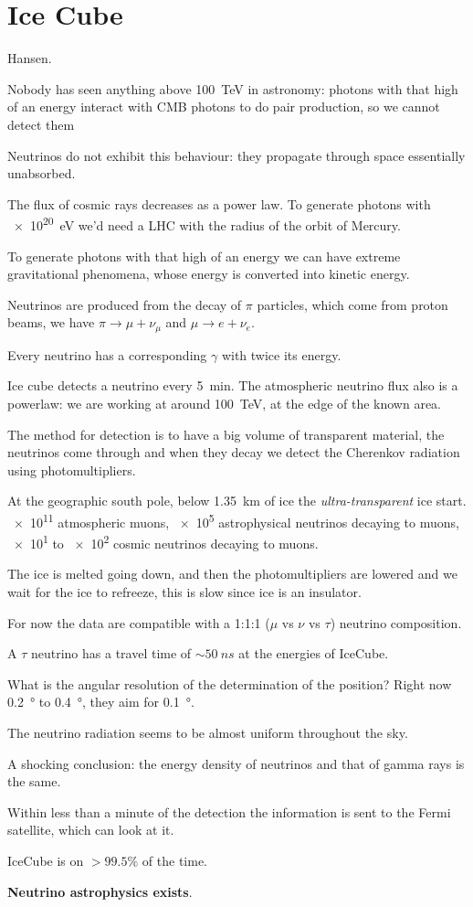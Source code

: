 \documentclass[main.tex]{subfiles}
\begin{document}
\section{Ice Cube}

Hansen.

Nobody has seen anything above \SI{100}{TeV} in astronomy: 
photons with that high of an energy interact with CMB photons to do pair production, so we cannot detect them

Neutrinos do not exhibit this behaviour: they propagate through space essentially unabsorbed.

The flux of cosmic rays decreases as a power law. To generate photons with \SI{e20}{eV} we'd need a LHC with the radius of the orbit of Mercury.

To generate photons with that high of an energy we can have extreme gravitational phenomena, whose energy is converted into kinetic energy. 

Neutrinos are produced from the decay of \(\pi \) particles, which come from proton beams, we have \(\pi \rightarrow \mu + \nu_{\mu } \) and \(\mu \rightarrow e + \nu_{e}\). 

Every neutrino has a corresponding \(\gamma \) with twice its energy.

Ice cube detects a neutrino every \SI{5}{min}. 
The atmospheric neutrino flux also is a powerlaw: we are working at around \SI{100}{TeV}, at the edge of the known area. 

The method for detection is to have a big volume of transparent material, the neutrinos come through and when they decay we detect the Cherenkov radiation using photomultipliers. 

At the geographic south pole, below \SI{1.35}{km} of ice the \emph{ultra-transparent} ice start. 
\num{e11} atmospheric muons, \num{e5} astrophysical neutrinos decaying to muons, \num{e1} to \num{e2} cosmic neutrinos decaying to muons. 

The ice is melted going down, and then the photomultipliers are lowered and we wait for the ice to refreeze, this is slow since ice is an insulator. 

For now the data are compatible with a 1:1:1 (\(\mu \) vs \(\nu \) vs \(\tau \)) neutrino composition. 

A \(\tau \) neutrino has a travel time of \(\sim \SI{50}{ns}\) at the energies of IceCube. 

What is the angular resolution of the determination of the position?
Right now \SI{.2}{\degree} to \SI{.4}{\degree}, they aim for \SI{.1}{\degree}.

The neutrino radiation seems to be almost uniform throughout the sky. 

A shocking conclusion: the energy density of neutrinos and that of gamma rays is the same. 

Within less than a minute of the detection the information is sent to the Fermi satellite, which can look at it. 

IceCube is on \(> 99.5\%\) of the time. 

\textbf{Neutrino astrophysics exists}. 
\end{document}
